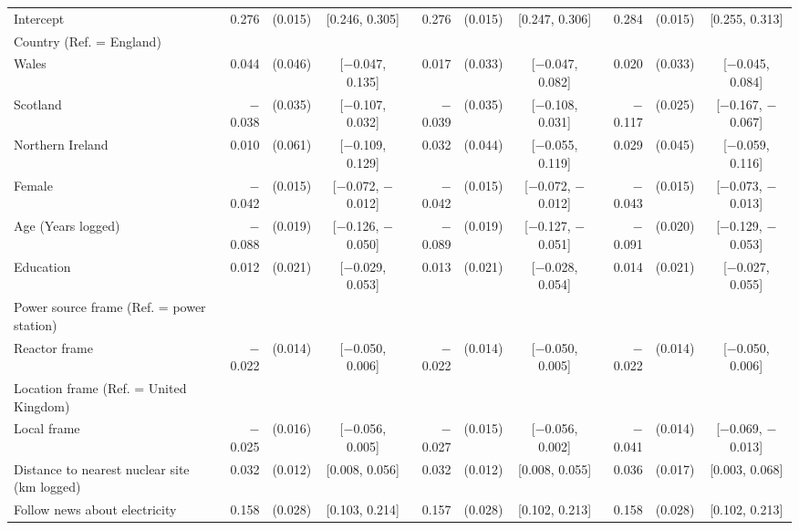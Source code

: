 \begin{landscape}
\begin{longtable}[t]{>{\raggedright\arraybackslash}p{2.8in}rrcrrcrrc}
\endfoot
\bottomrule
\endlastfoot
Intercept & 0.276 & (0.015) & {}[0.246, 0.305] & 0.276 & (0.015) & {}[0.247, 0.306] & 0.284 & (0.015) & {}[0.255, 0.313]\\
Country (Ref. = England) &  &  &  &  &  &  &  &  & \\
\hspace{1em}Wales & 0.044 & (0.046) & {}[$-$0.047, 0.135] & 0.017 & (0.033) & {}[$-$0.047, 0.082] & 0.020 & (0.033) & {}[$-$0.045, 0.084]\\
\hspace{1em}Scotland & $-$0.038 & (0.035) & {}[$-$0.107, 0.032] & $-$0.039 & (0.035) & {}[$-$0.108, 0.031] & $-$0.117 & (0.025) & {}[$-$0.167, $-$0.067]\\
\hspace{1em}Northern Ireland & 0.010 & (0.061) & {}[$-$0.109, 0.129] & 0.032 & (0.044) & {}[$-$0.055, 0.119] & 0.029 & (0.045) & {}[$-$0.059, 0.116]\\
Female & $-$0.042 & (0.015) & {}[$-$0.072, $-$0.012] & $-$0.042 & (0.015) & {}[$-$0.072, $-$0.012] & $-$0.043 & (0.015) & {}[$-$0.073, $-$0.013]\\
Age (Years logged) & $-$0.088 & (0.019) & {}[$-$0.126, $-$0.050] & $-$0.089 & (0.019) & {}[$-$0.127, $-$0.051] & $-$0.091 & (0.020) & {}[$-$0.129, $-$0.053]\\
Education & 0.012 & (0.021) & {}[$-$0.029, 0.053] & 0.013 & (0.021) & {}[$-$0.028, 0.054] & 0.014 & (0.021) & {}[$-$0.027, 0.055]\\
Power source frame (Ref. = power station) &  &  &  &  &  &  &  &  & \\
\hspace{1em}Reactor frame & $-$0.022 & (0.014) & {}[$-$0.050, 0.006] & $-$0.022 & (0.014) & {}[$-$0.050, 0.005] & $-$0.022 & (0.014) & {}[$-$0.050, 0.006]\\
Location frame (Ref. = United Kingdom) &  &  &  &  &  &  &  &  & \\
\hspace{1em}Local frame & $-$0.025 & (0.016) & {}[$-$0.056, 0.005] & $-$0.027 & (0.015) & {}[$-$0.056, 0.002] & $-$0.041 & (0.014) & {}[$-$0.069, $-$0.013]\\
Distance to nearest nuclear site (km logged) & 0.032 & (0.012) & {}[0.008, 0.056] & 0.032 & (0.012) & {}[0.008, 0.055] & 0.036 & (0.017) & {}[0.003, 0.068]\\
Follow news about electricity & 0.158 & (0.028) & {}[0.103, 0.214] & 0.157 & (0.028) & {}[0.102, 0.213] & 0.158 & (0.028) & {}[0.102, 0.213]\\

\end{longtable}
\end{landscape}
